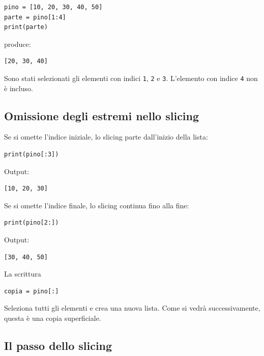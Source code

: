 \documentclass[11pt,a4paper]{book}
\begin{document}
\begin{lstlisting}[style=python]
pino = [10, 20, 30, 40, 50]
parte = pino[1:4]
print(parte)
\end{lstlisting}

produce:

\begin{lstlisting}[style=python, numbers=none]
[20, 30, 40]
\end{lstlisting}

Sono stati selezionati gli elementi con indici \texttt{1}, \texttt{2} e \texttt{3}. L'elemento con indice \texttt{4} non è incluso.

\subsection{Omissione degli estremi nello slicing}

Se si omette l'indice iniziale, lo slicing parte dall'inizio della lista:

\begin{lstlisting}[style=python]
print(pino[:3])
\end{lstlisting}

Output:

\begin{lstlisting}[style=python, numbers=none]
[10, 20, 30]
\end{lstlisting}

Se si omette l'indice finale, lo slicing continua fino alla fine:

\begin{lstlisting}[style=python]
print(pino[2:])
\end{lstlisting}

Output:

\begin{lstlisting}[style=python, numbers=none]
[30, 40, 50]
\end{lstlisting}

La scrittura

\begin{lstlisting}[style=python]
copia = pino[:]
\end{lstlisting}

Seleziona tutti gli elementi e crea una nuova lista. Come si vedrà successivamente, questa è una copia superficiale.

\subsection{Il passo dello slicing}
\end{document}
